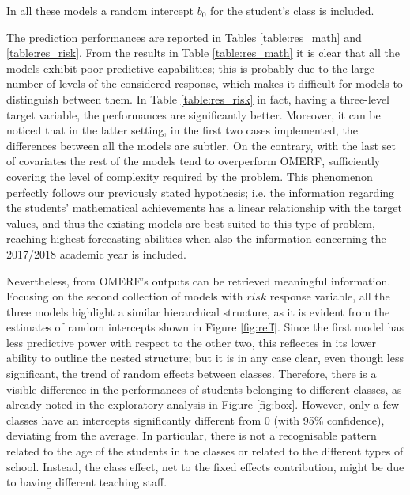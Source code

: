 In all these models a random intercept \(b_0\) for the student's class is included.

The prediction performances are reported in Tables \ref{table:res_math} and \ref{table:res_risk}.
From the results in Table \ref{table:res_math} it is clear that all the models exhibit poor predictive capabilities; this is probably due to the large number of levels of the considered response, which makes it difficult for models to distinguish between them.
In Table \ref{table:res_risk} in fact, having a three-level target variable, the performances are significantly better.
Moreover, it can be noticed that in the latter setting, in the first two cases implemented, the differences between all the models are subtler.
On the contrary, with the last set of covariates the rest of the models tend to overperform OMERF, sufficiently covering the level of complexity required by the problem. This phenomenon perfectly follows our previously stated hypothesis;
i.e. the information regarding the students' mathematical achievements has a linear relationship with the target values, and thus the existing models are best suited to this type of problem, reaching highest forecasting abilities when also the information concerning the 2017/2018 academic year is included.

Nevertheless, from OMERF's outputs can be retrieved meaningful information. Focusing on the second collection of models with \(risk\) response variable, all the three models highlight a similar hierarchical structure, as it is evident from the estimates of random intercepts shown in Figure \ref{fig:reff}.
Since the first model has less predictive power with respect to the other two, this reflectes in its lower ability to outline the nested structure; but it is in any case clear, even though less significant, the trend of random effects between classes.
Therefore, there is a visible difference in the performances of students belonging to different classes, as already noted in the exploratory analysis in Figure \ref{fig:box}. However, only a few classes have an intercepts significantly different from 0 (with 95\% confidence), deviating from the average.
In particular, there is not a recognisable pattern related to the age of the students in the classes or related to the different types of school. Instead, the class effect, net to the fixed effects contribution, might be due to having different teaching staff.

